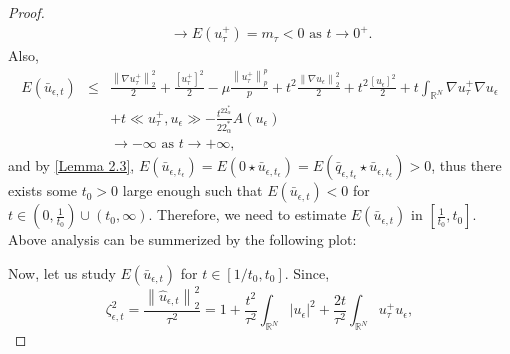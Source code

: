 \documentclass[11pt]{article}
\numberwithin{equation}{section}
\numberwithin{mytheorem}{section}
\begin{document}
\begin{proof}
\begin{eqnarray}
				&& \rightarrow E(u_{\tau}^+) =m_{\tau} <0 \text{ as } t\rightarrow0^+.
			\end{eqnarray}
			Also, 
			\begin{eqnarray}\label{4.13}
				E(\bar{u}_{\epsilon,t}) & \leq & \frac{\left\| \nabla u_{\tau}^+\right\|_2^2}{2}+\frac{[u_{\tau}^+]^2}{2}-\mu\frac{\left\| u_{\tau}^+\right\|_p^p}{p}+t^2\frac{\left\| \nabla u_{\epsilon} \right\|_2^2}{2}+t^2\frac{[u_{\epsilon}]^2}{2}+t\int_{\mathbb{R}^N}\nabla u_{\tau}^+\nabla u_{\epsilon}\nonumber\\
				&& + t\ll u_{\tau}^+,u_{\epsilon}\gg-\frac{t^{22^*_{\alpha}}}{22^*_{\alpha}}A(u_{\epsilon})\nonumber\\
				&&\rightarrow -\infty \text{ as } t\rightarrow+\infty,
			\end{eqnarray}
			and by \autoref{Lemma 2.3}, $E(\bar{u}_{\epsilon,t_{\epsilon}})=E(0\star \bar{u}_{\epsilon,t_{\epsilon}})=E(\bar{q}_{\epsilon,t_{\epsilon}}\star \bar{u}_{\epsilon,t_{\epsilon}})>0$, thus there exists some $t_0>0$ large enough such that $E(\bar{u}_{\epsilon,t})<0$ for $t\in (0,\frac{1}{t_0})\cup (t_0,\infty)$. Therefore, we need to estimate $E(\bar{u}_{\epsilon,t})$ in $[\frac{1}{t_0}, t_0]$. Above analysis can be summerized by the following plot:
			\begin{center}
			\end{center}
			Now, let us study $E(\bar{u}_{\epsilon,t})$ for $t\in [1/t_0,t_0]$. Since,
			\begin{equation*}
				\zeta_{\epsilon,t}^2 =  \frac{\left\| \hat{u}_{\epsilon,t}\right\|_2^2}{\tau^2}=1+\frac{t^2}{\tau^2}\int_{\mathbb{R}^N}|u_{\epsilon}|^2+\frac{2t}{\tau^2}\int_{\mathbb{R}^N}u_{\tau}^+u_{\epsilon},

\end{equation*}
\end{proof}
\end{document}
